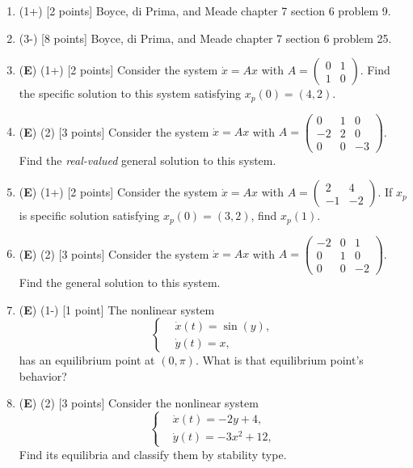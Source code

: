 \documentclass[12pt]{article}
\newcommand{\twobytwo}[4]{\begin{pmatrix} %
   #1 & #2 \\ #3 & #4 \end{pmatrix}}
\newcommand{\threebythree}[9]{\begin{pmatrix} %
   #1 & #2 & #3 \\ #4 & #5 & #6 \\ #7 & #8 & #9 \end{pmatrix}}
\begin{document}
\begin{enumerate}
\item (1+) [2 points] Boyce, di Prima, and Meade chapter 7 section 6 problem 9.

\item (3-) [8 points] Boyce, di Prima, and Meade chapter 7 section 6 problem 25. 

\item (\textbf{E}) (1+) [2 points] Consider the system \(\dot{x}=Ax\) with \(A=\twobytwo{0}{1}{1}{0}\). Find the specific solution to this system satisfying \(x_p(0)=(4,2)\).

\item (\textbf{E}) (2) [3 points] Consider the system \(\dot{x}=Ax\) with \(A=\threebythree{0}{1}{0}{-2}{2}{0}{0}{0}{-3}\). Find the \emph{real-valued} general solution to this system.

\item (\textbf{E}) (1+) [2 points] Consider the system \(\dot{x}=Ax\) with \(A=\twobytwo{2}{4}{-1}{-2}\). If \(x_p\) is specific solution satisfying \(x_p(0)=(3,2)\), find \(x_p(1)\).

\item (\textbf{E}) (2) [3 points] Consider the system \(\dot{x}=Ax\) with \(A=\threebythree{-2}{0}{1}{0}{1}{0}{0}{0}{-2}\). Find the general solution to this system.

\item (\textbf{E}) (1-) [1 point] The nonlinear system
\[
\left\lbrace
\begin{aligned}
   &\dot{x}(t)=\sin(y),\\
   &\dot{y}(t)=x,
\end{aligned}
\right.
\]
has an equilibrium point at \((0,\pi)\). What is that equilibrium point's behavior?

\item (\textbf{E}) (2) [3 points] Consider the nonlinear system
\[
\left\lbrace
\begin{aligned}
   &\dot{x}(t)=-2y+4,\\
   &\dot{y}(t)=-3x^2+12,
\end{aligned}
\right.
\]
Find its equilibria and classify them by stability type.


\end{enumerate}
\end{document}
